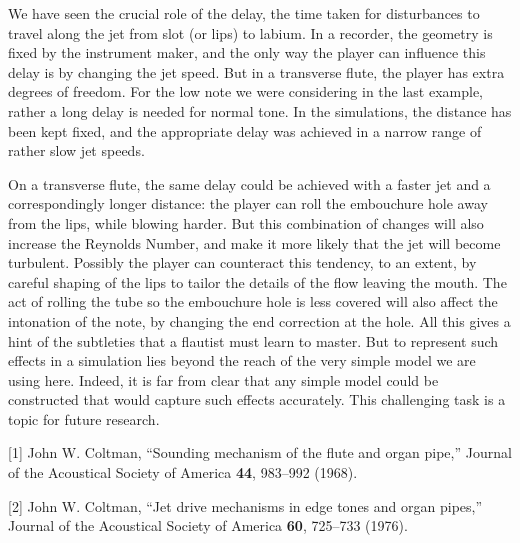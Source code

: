 

  We have seen the crucial role of the delay, the time taken for disturbances 
  to travel along the jet from slot (or lips) to labium. In a recorder, the 
  geometry is fixed by the instrument maker, and the only way the player can 
  influence this delay is by changing the jet speed. But in a transverse flute, 
  the player has extra degrees of freedom. For the low note we were considering 
  in the last example, rather a long delay is needed for normal tone. In the 
  simulations, the distance has been kept fixed, and the appropriate delay was 
  achieved in a narrow range of rather slow jet speeds. 

  On a transverse flute, the same delay could be achieved with a faster jet and 
  a correspondingly longer distance: the player can roll the embouchure hole 
  away from the lips, while blowing harder. But this combination of changes 
  will also increase the Reynolds Number, and make it more likely that the jet 
  will become turbulent. Possibly the player can counteract this tendency, to 
  an extent, by careful shaping of the lips to tailor the details of the flow 
  leaving the mouth. The act of rolling the tube so the embouchure hole is less 
  covered will also affect the intonation of the note, by changing the end 
  correction at the hole. All this gives a hint of the subtleties that a 
  flautist must learn to master. But to represent such effects in a simulation 
  lies beyond the reach of the very simple model we are using here. Indeed, it 
  is far from clear that any simple model could be constructed that would 
  capture such effects accurately. This challenging task is a topic for future 
  research. 



  \sectionreferences{}[1] John W. Coltman, “Sounding mechanism of the flute and 
  organ pipe,” Journal of the Acoustical Society of America \textbf{44}, 
  983–992 (1968). 

  [2] John W. Coltman, “Jet drive mechanisms in edge tones and organ pipes,” 
  Journal of the Acoustical Society of America \textbf{60}, 725–733 (1976). 

